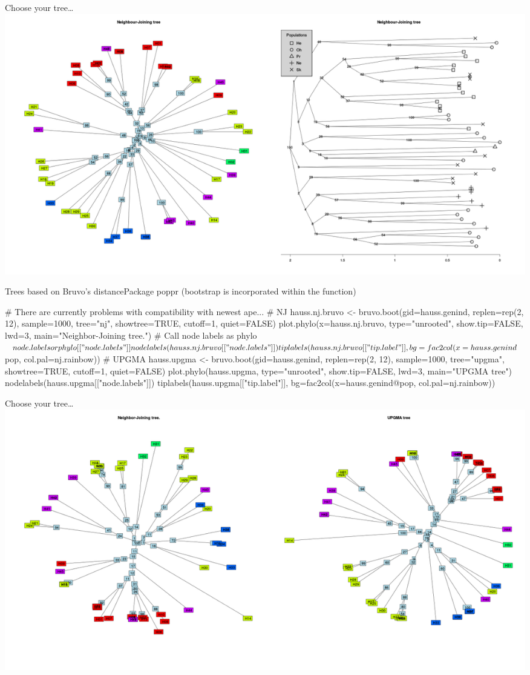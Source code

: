 \documentclass[compress, ucs, xelatex, 11pt, xcolor=svgnames,
  hyperref={
    bookmarks=true,
    unicode=true,
    colorlinks=true,
    pdftitle={Molecular data in R},
    plainpages=false,
    pdfauthor={Vojtech Zeisek},
    pdfsubject={Course about phylogeny and evolution in R},
    pdfcreator={XeLaTeX},
    pdfkeywords={R, evolution, phylogeny, molecular data},
    linkcolor=Tomato,
    anchorcolor=SaddleBrown,
    citecolor=Goldenrod,
    filecolor=DarkMagenta,
    menucolor=Sienna,
    urlcolor=DarkTurquoise,
    pdftex},
  url={hyphens, lowtilde} %
  ]{beamer}
\begin{document}
\begin{frame}{Choose your tree\ldots}
  \includegraphics[width=\textwidth]{nj2.png}
\end{frame}

\begin{frame}[fragile]{Trees based on Bruvo's distance}{Package poppr (bootstrap is incorporated within the function)}
  \begin{spluscode}
    # There are currently problems with compatibility with newest ape...
    # NJ
    hauss.nj.bruvo <- bruvo.boot(gid=hauss.genind, replen=rep(2, 12),
      sample=1000, tree="nj", showtree=TRUE, cutoff=1, quiet=FALSE)
    plot.phylo(x=hauss.nj.bruvo, type="unrooted", show.tip=FALSE,
      lwd=3, main="Neighbor-Joining tree.")
    # Call node labels as phylo$node.labels or phylo[["node.labels"]]
    nodelabels(hauss.nj.bruvo[["node.labels"]]) 
    tiplabels(hauss.nj.bruvo[["tip.label"]], bg=fac2col(x=hauss.genind$pop,
      col.pal=nj.rainbow))
    # UPGMA
    hauss.upgma <- bruvo.boot(gid=hauss.genind, replen=rep(2, 12),
      sample=1000, tree="upgma", showtree=TRUE, cutoff=1, quiet=FALSE)
    plot.phylo(hauss.upgma, type="unrooted", show.tip=FALSE, lwd=3,
      main="UPGMA tree")
    nodelabels(hauss.upgma[["node.labels"]])
    tiplabels(hauss.upgma[["tip.label"]], bg=fac2col(x=hauss.genind@pop,
      col.pal=nj.rainbow))
  \end{spluscode}
\end{frame}

\begin{frame}{Choose your tree\ldots}
  \includegraphics[width=\textwidth]{nj-upgma-bruvo.png}
\end{frame}
\end{document}
